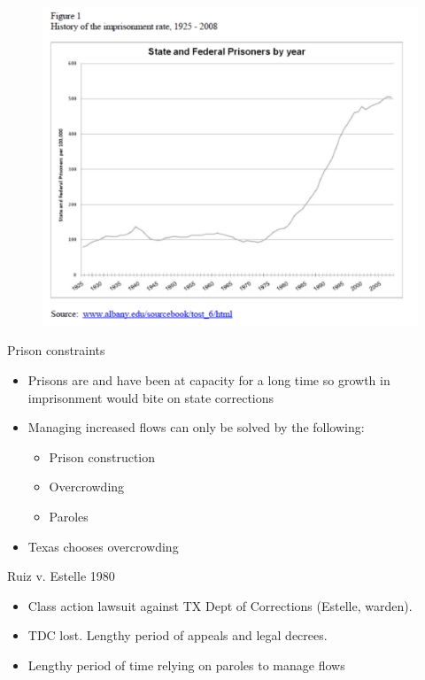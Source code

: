 \documentclass{beamer}
\begin{document}
\begin{frame}[plain]

\begin{figure}
\includegraphics[scale=0.5]{./lecture_includes/cook2010.pdf}
\end{figure}
\end{frame}


\begin{frame}{Prison constraints}

	
	\begin{itemize}
	\item Prisons are and have been at capacity for a long time so growth in imprisonment would bite on state corrections
	\item Managing increased flows can only be solved by the following:
		\begin{itemize}
		\item Prison construction
		\item Overcrowding
		\item Paroles
		\end{itemize}
	\item Texas chooses overcrowding
	\end{itemize}
\end{frame}



\begin{frame}{Ruiz v. Estelle 1980}

	
	\begin{itemize}
		\item Class action lawsuit against TX Dept of Corrections (Estelle, warden). 
		\item TDC lost.  Lengthy period of appeals and legal decrees.  
		\item Lengthy period of time relying on paroles to manage flows
	\end{itemize}
\end{frame}
\end{document}
